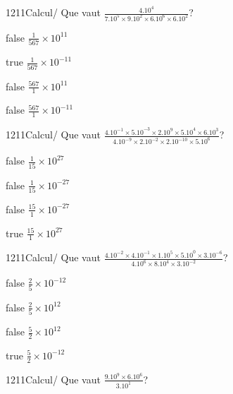             \begin{question}{1211}{Calcul}{}{/}
                Que vaut $\frac{4.10^{4}}{7.10^{5}\times 9.10^{2}\times 6.10^{6}\times 6.10^{2}}$?
            \end{question}
            \begin{reponses}
                \item[false] $\frac{1}{567}\times 10^{11}$
                \item[true] $\frac{1}{567}\times 10^{-11}$
                \item[false] $\frac{567}{1}\times 10^{11}$
                \item[false] $\frac{567}{1}\times 10^{-11}$
            \end{reponses}
            \begin{question}{1211}{Calcul}{}{/}
                Que vaut $\frac{4.10^{-1}\times 5.10^{-3}\times 2.10^{9}\times 5.10^{4}\times 6.10^{3}}{4.10^{-9}\times 2.10^{-2}\times 2.10^{-10}\times 5.10^{6}}$?
            \end{question}
            \begin{reponses}
                \item[false] $\frac{1}{15}\times 10^{27}$
                \item[false] $\frac{1}{15}\times 10^{-27}$
                \item[false] $\frac{15}{1}\times 10^{-27}$
                \item[true] $\frac{15}{1}\times 10^{27}$
            \end{reponses}
            \begin{question}{1211}{Calcul}{}{/}
                Que vaut $\frac{4.10^{-2}\times 4.10^{-1}\times 1.10^{5}\times 5.10^{0}\times 3.10^{-6}}{4.10^{6}\times 8.10^{4}\times 3.10^{-2}}$?
            \end{question}
            \begin{reponses}
                \item[false] $\frac{2}{5}\times 10^{-12}$
                \item[false] $\frac{2}{5}\times 10^{12}$
                \item[false] $\frac{5}{2}\times 10^{12}$
                \item[true] $\frac{5}{2}\times 10^{-12}$
            \end{reponses}
            \begin{question}{1211}{Calcul}{}{/}
                Que vaut $\frac{9.10^{9}\times 6.10^{6}}{3.10^{1}}$?
            \end{question}

